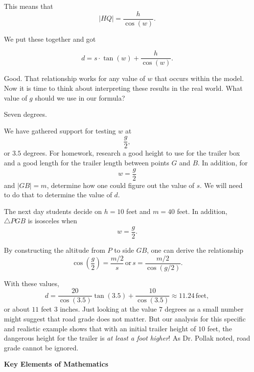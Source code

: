 {\begin{scriptlist}
      This means that
      $$
        \lvert HQ\rvert=\frac{h}{\cos(w)}.
      $$

      We put these together and got\vspace{1.5\baselineskip}

      $$
        d=s\cdot \tan(w)+\frac{h}{\cos(w)}.
      $$

      \item [Teacher:] Good. That relationship works for any value of $w$ that occurs within the model. Now it is time to think about interpreting these results in the real world. What value of $g$ should we use in our formula?

      \item [Class:] Seven degrees.

      \item [Teacher:] We have gathered support for testing $w$ at
      $$
        \frac{g}{2},
      $$
      or $3.5$ degrees. For homework, research a good height to use for the trailer box and a good length for the trailer length between points $G$ and $B$. In addition, for
      $$
        w=\frac{g}{2}
      $$
      and $\lvert GB\rvert = m$, determine how one could figure out the value of $s$. We will need to do that to determine the value of $d$.\vspace{.5\baselineskip}
    \end{scriptlist}

    The next day students decide on $h = 10$ feet and $m = 40$ feet. In addition, $\triangle PGB$ is isosceles when
    $$
      w=\frac{g}{2}.
    $$

    By constructing the altitude from $P$ to side $GB$, one can derive the relationship
    $$
      \cos\left(\frac{g}{2}\right)=\frac{m/2}{s} \, \text{or} \, s=\frac{m/2}{\cos(g/2)}.
    $$

    With these values,
    $$
      d=\frac{20}{\cos(3.5)}\tan(3.5)+\frac{10}{\cos(3.5)}\approx 11.24 \, \text{feet},
    $$
    or about $11$ feet $3$ inches. Just looking at the value $7$ degrees as a small number might suggest that road grade does not matter. But our analysis for this specific and realistic example shows that with an initial trailer height of $10$ feet, the dangerous height for the trailer is \emph{at least a foot higher}! As Dr. Pollak noted, road grade cannot be ignored.\vspace{\baselineskip}

    \textbf{Key Elements of Mathematics}

    \begin{hanglist}
    \end{hanglist}

}
